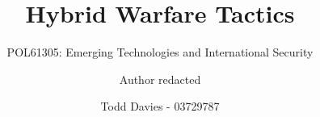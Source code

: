 \usepackage{microtype}
\usepackage{hyperref}

\usepackage{csquotes}

\usepackage{float}

\usepackage{setspace}

\usepackage{pgfplots}
\pgfplotsset{compat=newest}

\usepackage[square]{natbib}
\usepackage{url}
\DeclareRobustCommand{\firstsecond}[2]{#1}
\usepackage{caption}

\ifdefined\isanonymous
  \author{Author redacted}
\else
  \author{Todd Davies - 03729787}
\fi


\newcommand{\Title}{Hybrid Warfare Tactics}

\title{\Title}
\subtitle{POL61305: Emerging Technologies and International Security}
